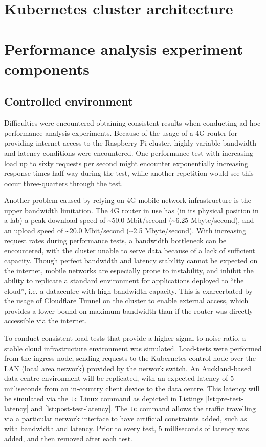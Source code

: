 \section{Kubernetes cluster architecture}

\section{Performance analysis experiment components}
\subsection{Controlled environment}

Difficulties were encountered obtaining consistent results when conducting ad hoc performance analysis experiments. Because of the usage of a 4G router for providing internet access to the Raspberry Pi cluster, highly variable bandwidth and latency conditions were encountered. One performance test with increasing load up to sixty requests per second might encounter exponentially increasing response times half-way during the test, while another repetition would see this occur three-quarters through the test. 

Another problem caused by relying on 4G mobile network infrastructure is the upper bandwidth limitation. The 4G router in use has (in its physical position in a lab) a peak download speed of \textasciitilde50.0 Mbit/second (\textasciitilde6.25 Mbyte/second), and an upload speed of \textasciitilde20.0 Mbit/second (\textasciitilde2.5 Mbyte/second). With increasing request rates during performance tests, a bandwidth bottleneck can be encountered, with the cluster unable to serve data because of a lack of sufficient capacity. Though perfect bandwidth and latency stability cannot be expected on the internet, mobile networks are especially prone to instability, and inhibit the ability to replicate a standard environment for applications deployed to ``the cloud'', i.e. a datacentre with high bandwidth capacity. This is exarcerbated by the usage of Cloudflare Tunnel on the cluster to enable external access, which provides a lower bound on maximum bandwidth than if the router was directly accessible via the internet.

To conduct consistent load-tests that provide a higher signal to noise ratio, a stable cloud infrastructure environment was simulated. Load-tests were performed from the ingress node, sending requests to the Kubernetes control node over the LAN (local area network) provided by the network switch. An Auckland-based data centre environment will be replicated, with an expected latency of 5 miiliseconds from an in-country client device to the data centre. This latency will be simulated via the \verb|tc| Linux command as depicted in Listings \ref{lst:pre-test-latency} and \ref{lst:post-test-latency}. The \verb|tc| command allows the traffic travelling via a particular network interface to have artificial constraints added, such as with bandwidth and latency. Prior to every test, 5 milliseconds of latency was added, and then removed after each test.

